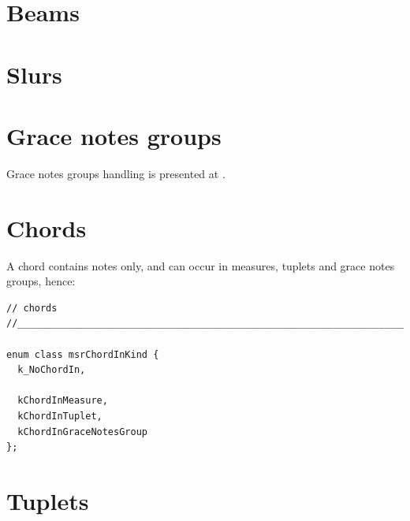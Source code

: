\section{Beams}\label{Beams}


\section{Slurs}\label{Slurs}


\section{Grace notes groups}\label{Grace notes groups}

Grace notes groups handling is presented at .


\section{Chords}\label{Chords}

A chord contains notes only, and can occur in measures, tuplets and grace notes groups, hence:
\begin{lstlisting}[language=CPlusPlus]
// chords
//______________________________________________________________________________

enum class msrChordInKind {
  k_NoChordIn,

  kChordInMeasure,
  kChordInTuplet,
  kChordInGraceNotesGroup
};
\end{lstlisting}


\section{Tuplets}\label{Tuplets}

